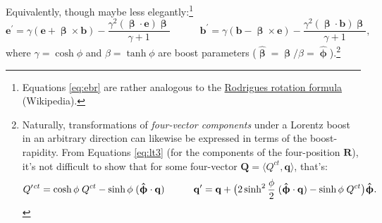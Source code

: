 \documentclass[12pt]{article}
\renewcommand{\vv}[1]{\mathbf{#1}}
\newcommand{\vvbeta}{\bm{\upbeta}}
\newcommand{\hatbeta}{\bm{\hat{\upbeta}}}
\newcommand{\hatphi}{\bm{\hat{\upphi}}}
\begin{document}
Equivalently, though maybe less elegantly:\footnote{Equations \ref{eq:ebr} are rather analogous to the \href{https://en.wikipedia.org/wiki/Rodrigues\%27_rotation_formula}{Rodrigues rotation formula} (Wikipedia).}
\begin{equation*}
\vv e^\prime = \gamma \left( \vv e + \vvbeta \times \vv b \right) - \dfrac{\gamma^2 (\vvbeta \cdot \vv e) \vvbeta}{\gamma + 1} \qquad \quad \vv b^\prime = \gamma \left( \vv b - \vvbeta \times \vv e \right) - \dfrac{\gamma^2 (\vvbeta \cdot \vv b) \vvbeta}{\gamma + 1},
\end{equation*}
where $\gamma = \cosh{\phi}$ and $\beta = \tanh{\phi}$ are boost parameters ($\hatbeta = \vvbeta / \beta = \hatphi$).\footnote{Naturally, transformations of \emph{four-vector components} under a Lorentz boost in an arbitrary direction can likewise be expressed in terms of the boost-rapidity. From Equations \ref{eq:lt3} (for the components of the four-position $\vv R$), it's not difficult to show that for some four-vector $\vv Q = \langle Q^{ct}, \vv q \rangle$, that's:
\begin{equation*}
Q^{\prime  \mkern1.5mu ct} = \cosh \phi \; Q^{ct} - \sinh \phi \; ( \hatphi \cdot \vv q ) \qquad \quad
\vv q^{\prime} = \vv q + \big( 2 \sinh^2 \frac{\phi}{2} \; ( \hatphi \cdot \vv q ) - \sinh \phi \; Q^{ct} \big) \hatphi .
\end{equation*}}
\end{document}

